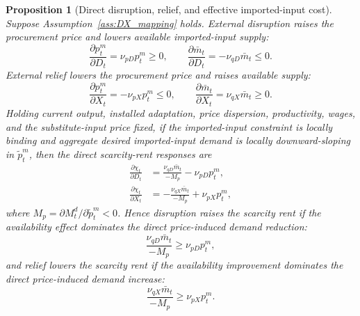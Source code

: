 ﻿\documentclass[12pt]{article}
\newtheorem{proposition}{Proposition}
\theoremstyle{remark}
\begin{document}
\begin{proposition}[Direct disruption, relief, and effective imported-input cost]\label{prop:DX_effects}
Suppose Assumption~\ref{ass:DX_mapping} holds. External disruption raises the procurement price
and lowers available imported-input supply:
\begin{equation}
    \frac{\partial p_t^m}{\partial D_t}=\nu_{pD}p_t^m\ge 0,
    \qquad
    \frac{\partial \bar m_t}{\partial D_t}=-\nu_{qD}\bar m_t\le 0.
    \label{eq:D_derivatives}
\end{equation}
External relief lowers the procurement price and raises available supply:
\begin{equation}
    \frac{\partial p_t^m}{\partial X_t}=-\nu_{pX}p_t^m\le 0,
    \qquad
    \frac{\partial \bar m_t}{\partial X_t}=\nu_{qX}\bar m_t\ge 0.
    \label{eq:X_derivatives}
\end{equation}
Holding current output, installed adaptation, price dispersion, productivity, wages, and the
substitute-input price fixed, if the imported-input constraint is locally binding and aggregate
desired imported-input demand is locally downward-sloping in $\tilde p_t^m$, then the direct
scarcity-rent responses are
\begin{align}
    \frac{\partial\chi_t}{\partial D_t}
    &=
    \frac{\nu_{qD}\bar m_t}{-M_p}
    -
    \nu_{pD}p_t^m,
    \label{eq:chi_D_exact}\\
    \frac{\partial\chi_t}{\partial X_t}
    &=
    -
    \frac{\nu_{qX}\bar m_t}{-M_p}
    +
    \nu_{pX}p_t^m,
    \label{eq:chi_X_exact}
\end{align}
where $M_p=\partial M_t^d/\partial\tilde p_t^m<0$. Hence disruption raises the scarcity rent if
the availability effect dominates the direct price-induced demand reduction:
\begin{equation}
    \frac{\nu_{qD}\bar m_t}{-M_p}
    \ge
    \nu_{pD}p_t^m,
    \label{eq:D_quantity_dominance}
\end{equation}
and relief lowers the scarcity rent if the availability improvement dominates the direct
price-induced demand increase:
\begin{equation}
    \frac{\nu_{qX}\bar m_t}{-M_p}
    \ge
    \nu_{pX}p_t^m.
    \label{eq:X_quantity_dominance}
\end{equation}
\end{proposition}
\end{document}
